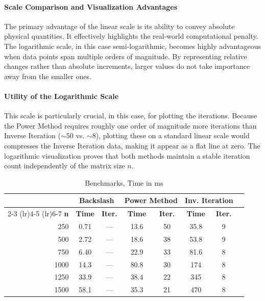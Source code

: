 \documentclass[unicode,11pt,a4paper,oneside,numbers=endperiod,openany]{scrartcl}
\begin{document}
\paragraph{Scale Comparison and Visualization Advantages}
The primary advantage of the linear scale is its ability to convey absolute physical quantities. It effectively highlights the real-world computational penalty. The logarithmic scale, in this case semi-logarithmic, becomes highly advantageous when data points span multiple orders of magnitude. By representing relative changes rather than absolute increments, larger values do not take importance away from the smaller ones.

\paragraph{Utility of the Logarithmic Scale}
This scale is particularly crucial, in this case, for plotting the iterations. Because the Power Method requires roughly one order of magnitude more iterations than Inverse Iteration ($\sim 50$ vs. $\sim 8$), plotting these on a standard linear scale would compresses the Inverse Iteration data, making it appear as a flat line at zero. The logarithmic visualization proves that both methods maintain a stable iteration count independently of the matrix size $n$.

\begin{table}[t!]
    \centering
    \begin{tabular}{rccccccc}
        \toprule
        & \multicolumn{2}{c}{\textbf{Backslash}} & \multicolumn{2}{c}{\textbf{Power Method}} & \multicolumn{2}{c}{\textbf{Inv. Iteration}} \\
        \cmidrule(lr){2-3} \cmidrule(lr){4-5} \cmidrule(lr){6-7}
        \textbf{n} & \textbf{Time} & \textbf{Iter.} & \textbf{Time} & \textbf{Iter.} & \textbf{Time} & \textbf{Iter.} \\
        \midrule
        250  & 0.71  & --- & 13.6 & 50 & 35.8  & 9 \\
        500  & 2.72  & --- & 18.6 & 38 & 53.8  & 9 \\
        750  & 6.40  & --- & 22.9 & 33 & 81.6  & 8 \\
        1000 & 14.3 & --- & 80.8 & 30 & 174 & 8 \\
        1250 & 33.9 & --- & 38.4 & 22 & 345 & 8 \\
        1500 & 58.1 & --- & 35.3 & 21 & 470 & 8 \\
        \bottomrule
    \end{tabular}
    \caption{Benchmarks, Time in ms}
\end{table}
\end{document}
